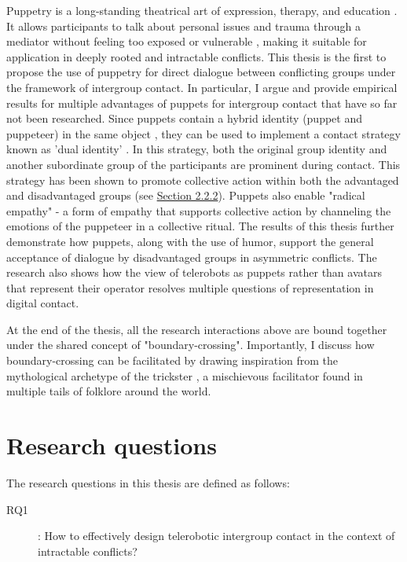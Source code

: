 \documentclass[dissertation,math,vertlayout,pdfa,colorlinks]{aaltoseries}
\begin{document}
Puppetry is a long-standing theatrical art of expression, therapy, and education \cite{krogerPuppetPedagogicalTool2019}. It allows participants to talk about personal issues and trauma through a mediator without feeling too exposed or vulnerable \cite{purcell-gatesAppliedPuppetryCommunities2020}, making it suitable for application in deeply rooted and intractable conflicts. This thesis is the first to propose the use of puppetry for direct dialogue between conflicting groups under the framework of intergroup contact. In particular, I argue and provide empirical results for multiple advantages of puppets for intergroup contact that have so far not been researched. Since puppets contain a hybrid identity (puppet and puppeteer) in the same object \cite{wisniewskaHybridityPuppetry2020}, they can be used to implement a contact strategy known as 'dual identity' \cite{gaertnerCategorizationRecategorizationIntergroup2005}. In this strategy,  both the original group identity and another subordinate group of the participants are prominent during contact. This strategy has been shown to promote collective action within both the advantaged and disadvantaged groups \cite{hasslerIntergroupContactSocial2021} (see \hyperref[sec:collective_action]{Section 2.2.2}). Puppets also enable "radical empathy" \cite{astlesWalkWalkMy2020} - a form of empathy that supports collective action by channeling the emotions of the puppeteer in a collective ritual. The results of this thesis further demonstrate how puppets, along with the use of humor, support the general acceptance of dialogue by disadvantaged groups in asymmetric conflicts. The research also shows how the view of telerobots as puppets rather than avatars that represent their operator resolves multiple questions of representation in digital contact.

At the end of the thesis, all the research interactions above are bound together under the shared concept of "boundary-crossing". Importantly, I discuss how boundary-crossing can be facilitated by drawing inspiration from the mythological archetype of the trickster \cite{hydeTricksterMakesThis1997}, a mischievous facilitator found in multiple tails of folklore around the world.

\section{Research questions}
The research questions in this thesis are defined as follows:

\begin{description}
\item[RQ1]: How to effectively design telerobotic intergroup contact in the context of intractable conflicts?
\end{description}
\end{document}
